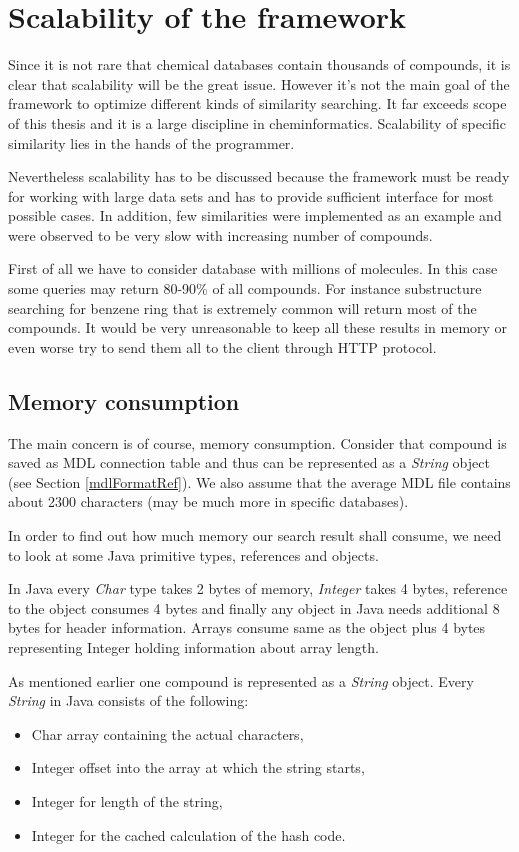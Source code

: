 \documentclass[thesis=M,english]{FITthesis}[2012/10/20]
\begin{document}
\section{Scalability of the framework}
Since it is not rare that chemical databases contain thousands of compounds, it is clear that scalability will be the great issue. However it’s not the main goal of the framework to optimize different kinds of similarity searching. It far exceeds scope of this thesis and it is a large discipline in cheminformatics. Scalability of specific similarity lies in the hands of the programmer. 

Nevertheless scalability has to be discussed because the framework must be ready for working with large data sets and has to provide sufficient interface for most possible cases. In addition, few similarities were implemented as an example and were observed to be very slow with increasing number of compounds.

First of all we have to consider database with millions of molecules. In this case some queries may return 80-90\% of all compounds. For instance substructure searching for benzene ring that is extremely common will return most of the compounds.  It would be very unreasonable to keep all these results in memory or even worse try to send them all to the client through HTTP protocol. 

\subsection{Memory consumption}
\label{memoryConsumptionRef}
The main concern is of course, memory consumption. Consider that compound is saved as MDL connection table and thus can be represented as a \textit{String} object (see Section \ref{mdlFormatRef}). We also assume that the average MDL file contains about 2300 characters (may be much more in specific databases). 

In order to find out how much memory our search result shall consume, we need to look at some Java primitive types, references and objects. 

In Java every \textit{Char} type takes 2 bytes of memory, \textit{Integer} takes 4 bytes, reference to the object consumes 4 bytes and finally any object in Java needs additional 8 bytes for header information. Arrays consume same as the object plus 4 bytes representing Integer holding information about array length.  

As mentioned earlier one compound is represented as a \textit{String} object. Every \textit{String} in Java consists of the following:
\begin{itemize}
\item Char array containing the actual characters,
\item Integer offset into the array at which the string starts,
\item Integer for length of the string,
\item Integer for the cached calculation of the hash code.
\end{itemize}
\end{document}

